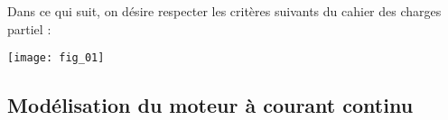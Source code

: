 
Dans ce qui suit, on désire respecter les critères suivants du cahier des charges partiel :
\begin{center}
	\texttt{[image: fig\_01]}
\end{center}



\subsection*{Modélisation du moteur à courant continu}


